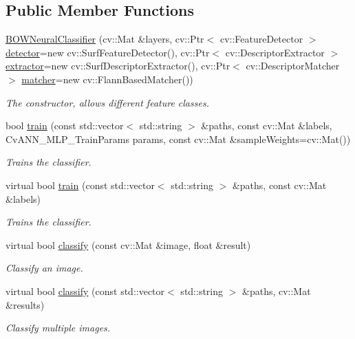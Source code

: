 \subsection*{Public Member Functions}
\begin{DoxyCompactItemize}
\item 
\hyperlink{classBOWNeuralClassifier_a98d08040e7d499f34c31a03d70cc7266}{BOWNeuralClassifier} (cv::Mat \&layers, cv::Ptr$<$ cv::FeatureDetector $>$ \hyperlink{classBOWClassifier_af98420aa410054ef3010f4c098931a41}{detector}=new cv::SurfFeatureDetector(), cv::Ptr$<$ cv::DescriptorExtractor $>$ \hyperlink{classBOWClassifier_a429b9a83879611a7c3e06eeacec9fb18}{extractor}=new cv::SurfDescriptorExtractor(), cv::Ptr$<$ cv::DescriptorMatcher $>$ \hyperlink{classBOWClassifier_a35057956434d92402d24f2628cfaf35c}{matcher}=new cv::FlannBasedMatcher())
\begin{DoxyCompactList}\small\item\em The constructor, allows different feature classes. \item\end{DoxyCompactList}\item 
bool \hyperlink{classBOWNeuralClassifier_af5bde18bb49d45421ea1332dee9ff9fa}{train} (const std::vector$<$ std::string $>$ \&paths, const cv::Mat \&labels, CvANN\_\-MLP\_\-TrainParams params, const cv::Mat \&sampleWeights=cv::Mat())
\begin{DoxyCompactList}\small\item\em Trains the classifier. \item\end{DoxyCompactList}\item 
virtual bool \hyperlink{classBOWNeuralClassifier_a8e29bc1d8b2fe3d3b362a5f224d5a095}{train} (const std::vector$<$ std::string $>$ \&paths, const cv::Mat \&labels)
\begin{DoxyCompactList}\small\item\em Trains the classifier. \item\end{DoxyCompactList}\item 
virtual bool \hyperlink{classBOWNeuralClassifier_accce7f4efd81373d87b9a6cef7802e1b}{classify} (const cv::Mat \&image, float \&result)
\begin{DoxyCompactList}\small\item\em Classify an image. \item\end{DoxyCompactList}\item 
virtual bool \hyperlink{classBOWNeuralClassifier_afbb503e23b8f881917ab1ea1cc6e2ece}{classify} (const std::vector$<$ std::string $>$ \&paths, cv::Mat \&results)
\begin{DoxyCompactList}\small\item\em Classify multiple images. \item\end{DoxyCompactList}\end{DoxyCompactItemize}


